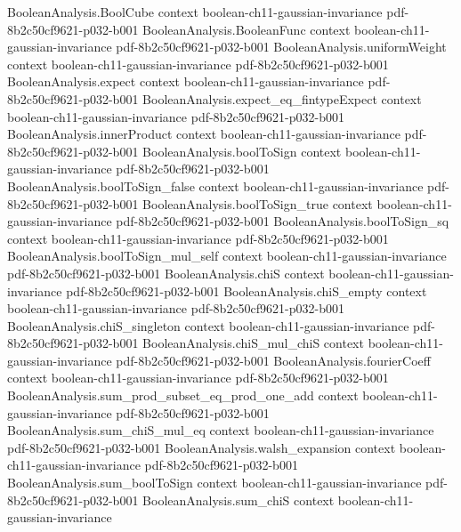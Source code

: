 \begin{lemma}
\proofstep
  {BooleanAnalysis.BoolCube}
  {context}
  {boolean-ch11-gaussian-invariance}
  {pdf-8b2c50cf9621-p032-b001}
\proofstep
  {BooleanAnalysis.BooleanFunc}
  {context}
  {boolean-ch11-gaussian-invariance}
  {pdf-8b2c50cf9621-p032-b001}
\proofstep
  {BooleanAnalysis.uniformWeight}
  {context}
  {boolean-ch11-gaussian-invariance}
  {pdf-8b2c50cf9621-p032-b001}
\proofstep
  {BooleanAnalysis.expect}
  {context}
  {boolean-ch11-gaussian-invariance}
  {pdf-8b2c50cf9621-p032-b001}
\proofstep
  {BooleanAnalysis.expect_eq_fintypeExpect}
  {context}
  {boolean-ch11-gaussian-invariance}
  {pdf-8b2c50cf9621-p032-b001}
\proofstep
  {BooleanAnalysis.innerProduct}
  {context}
  {boolean-ch11-gaussian-invariance}
  {pdf-8b2c50cf9621-p032-b001}
\proofstep
  {BooleanAnalysis.boolToSign}
  {context}
  {boolean-ch11-gaussian-invariance}
  {pdf-8b2c50cf9621-p032-b001}
\proofstep
  {BooleanAnalysis.boolToSign_false}
  {context}
  {boolean-ch11-gaussian-invariance}
  {pdf-8b2c50cf9621-p032-b001}
\proofstep
  {BooleanAnalysis.boolToSign_true}
  {context}
  {boolean-ch11-gaussian-invariance}
  {pdf-8b2c50cf9621-p032-b001}
\proofstep
  {BooleanAnalysis.boolToSign_sq}
  {context}
  {boolean-ch11-gaussian-invariance}
  {pdf-8b2c50cf9621-p032-b001}
\proofstep
  {BooleanAnalysis.boolToSign_mul_self}
  {context}
  {boolean-ch11-gaussian-invariance}
  {pdf-8b2c50cf9621-p032-b001}
\proofstep
  {BooleanAnalysis.chiS}
  {context}
  {boolean-ch11-gaussian-invariance}
  {pdf-8b2c50cf9621-p032-b001}
\proofstep
  {BooleanAnalysis.chiS_empty}
  {context}
  {boolean-ch11-gaussian-invariance}
  {pdf-8b2c50cf9621-p032-b001}
\proofstep
  {BooleanAnalysis.chiS_singleton}
  {context}
  {boolean-ch11-gaussian-invariance}
  {pdf-8b2c50cf9621-p032-b001}
\proofstep
  {BooleanAnalysis.chiS_mul_chiS}
  {context}
  {boolean-ch11-gaussian-invariance}
  {pdf-8b2c50cf9621-p032-b001}
\proofstep
  {BooleanAnalysis.fourierCoeff}
  {context}
  {boolean-ch11-gaussian-invariance}
  {pdf-8b2c50cf9621-p032-b001}
\proofstep
  {BooleanAnalysis.sum_prod_subset_eq_prod_one_add}
  {context}
  {boolean-ch11-gaussian-invariance}
  {pdf-8b2c50cf9621-p032-b001}
\proofstep
  {BooleanAnalysis.sum_chiS_mul_eq}
  {context}
  {boolean-ch11-gaussian-invariance}
  {pdf-8b2c50cf9621-p032-b001}
\proofstep
  {BooleanAnalysis.walsh_expansion}
  {context}
  {boolean-ch11-gaussian-invariance}
  {pdf-8b2c50cf9621-p032-b001}
\proofstep
  {BooleanAnalysis.sum_boolToSign}
  {context}
  {boolean-ch11-gaussian-invariance}
  {pdf-8b2c50cf9621-p032-b001}
\proofstep
  {BooleanAnalysis.sum_chiS}
  {context}
  {boolean-ch11-gaussian-invariance}

\end{lemma}
